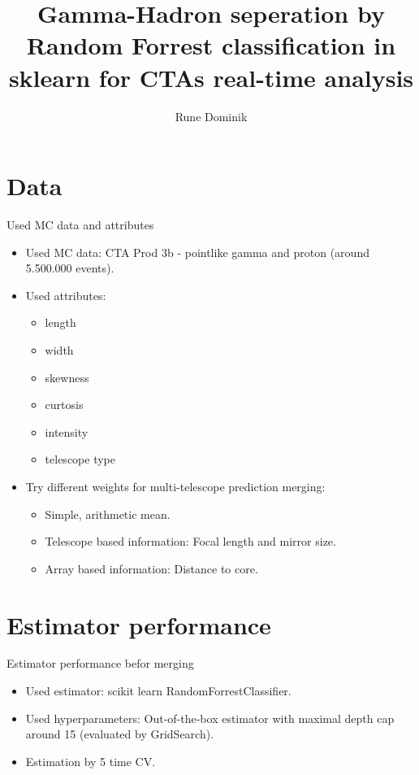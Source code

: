 \documentclass[aspectratio=1610, professionalfonts, 9pt]{beamer}
\title{Gamma-Hadron seperation by Random Forrest classification in sklearn for CTAs
real-time analysis}
\author[R.~Dominik]{Rune Dominik}
\institute[Experimentelle Physik Vb]{Experimentelle Physik Vb \\  Fakultät Physik}
\begin{document}
\maketitle

\section{Data}
  \begin{frame}{Used MC data and attributes}
    \begin{itemize}
      \item Used MC data: CTA Prod 3b - pointlike gamma and proton (around 5.500.000 events).

      \item Used attributes:
      \begin{itemize}
        \item length
        \item width
        \item skewness
        \item curtosis
        \item intensity
        \item telescope type
      \end{itemize}

      \item Try different weights for multi-telescope prediction merging:
      \begin{itemize}
        \item Simple, arithmetic mean.
        \item Telescope based information: Focal length and mirror size.
        \item Array based information: Distance to core.
      \end{itemize}
    \end{itemize}
  \end{frame}


\section{Estimator performance}
  \begin{frame}{Estimator performance befor merging}
    \begin{itemize}
      \item Used estimator: scikit learn RandomForrestClassifier.
      \item Used hyperparameters: Out-of-the-box estimator with maximal depth cap
            around 15 (evaluated by GridSearch).
      \item Estimation by 5 time CV.
    \end{itemize}
  \end{frame}
\end{document}
